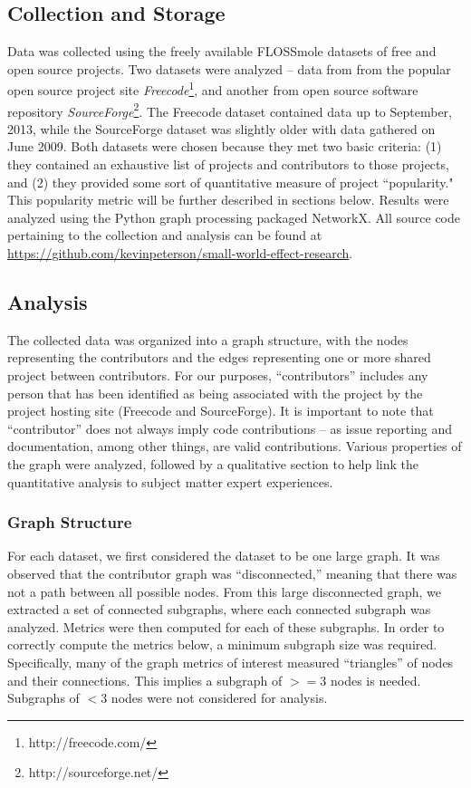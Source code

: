 \documentclass{proc}
\begin{document}
\subsection{Collection and Storage}
Data was collected using the freely available FLOSSmole\cite{floss2006} datasets of free and open source projects. Two datasets were analyzed -- data from from the popular open source project site \textit{Freecode}\footnote{http://freecode.com/}, and another from open source software repository \textit{SourceForge}\footnote{http://sourceforge.net/}. The Freecode dataset contained data up to September, 2013, while the SourceForge dataset was slightly older with data gathered on June 2009. Both datasets were chosen because they met two basic criteria: (1) they contained an exhaustive list of projects and contributors to those projects, and (2) they provided some sort of quantitative measure of project ``popularity." This popularity metric will be further described in sections below. Results were analyzed using the Python graph processing packaged NetworkX\cite{hagberg-2008-exploring}. All source code pertaining to the collection and analysis can be found at \url{https://github.com/kevinpeterson/small-world-effect-research}.

\subsection{Analysis}
The collected data was organized into a graph structure, with the nodes representing the contributors and the edges representing one or more shared project between contributors. For our purposes, ``contributors'' includes any person that has been identified as being associated with the project by the project hosting site (Freecode and SourceForge). It is important to note that ``contributor'' does not always imply code contributions -- as issue reporting and documentation, among other things, are valid contributions. Various properties of the graph were analyzed, followed by a qualitative section to help link the quantitative analysis to subject matter expert experiences.

\subsubsection{Graph Structure}
For each dataset, we first considered the dataset to be one large graph. It was observed that the contributor graph was ``disconnected,'' meaning that there was not a path between all possible nodes. From this large disconnected graph, we extracted a set of connected subgraphs, where each connected subgraph was analyzed. Metrics were then computed for each of these subgraphs. In order to correctly compute the metrics below, a minimum subgraph size was required. Specifically, many of the graph metrics of interest measured ``triangles'' of nodes and their connections. This implies a subgraph of {$>= 3$} nodes is needed. Subgraphs of {$< 3$} nodes were not considered for analysis.
\end{document}
